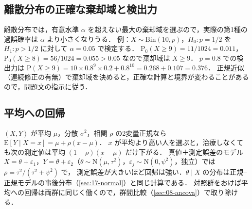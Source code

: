 \documentclass[a4paper,11pt,openany]{ltjsbook}
\newcommand{\E}{\mathrm{E}}
\newcommand{\Prob}{\mathrm{P}}
\newcommand{\Normal}{\mathrm{N}}
\newcommand{\Bin}{\mathrm{Bin}}
\begin{document}
\subsection{離散分布の正確な棄却域と検出力}\label{subsec:G-exact}
離散分布では，有意水準 $\alpha$ を超えない最大の棄却域を選ぶので，実際の第1種の過誤確率は $\alpha$ より小さくなりうる．
例：$X\sim\Bin(10,p)$，$H_0:p=1/2$ を $H_1:p>1/2$ に対して $\alpha=0.05$ で検定する．
$\Prob_0(X\ge9)=11/1024=0.011$，$\Prob_0(X\ge8)=56/1024=0.055>0.05$ なので棄却域は $X\ge9$．
$p=0.8$ での検出力は $\Prob(X\ge9)=10\times0.8^9\times0.2+0.8^{10}=0.268+0.107=0.376$．
正規近似（連続修正の有無）で棄却域を決めると，正確な計算と境界が変わることがあるので，問題文の指示に従う．

\subsection{平均への回帰}\label{subsec:G-rtm}
$(X,Y)$ が平均 $\mu$，分散 $\sigma^2$，相関 $\rho$ の2変量正規なら $\E[Y\mid X=x]=\mu+\rho(x-\mu)$．
$x$ が平均より高い人を選ぶと，治療しなくても次の測定値は平均 $(1-\rho)(x-\mu)$ だけ下がる．
真値＋測定誤差のモデル $X=\theta+\varepsilon_1$，$Y=\theta+\varepsilon_2$（$\theta\sim\Normal(\mu,\tau^2)$，$\varepsilon_j\sim\Normal(0,\psi^2)$，独立）では $\rho=\tau^2/(\tau^2+\psi^2)$ で，
測定誤差が大きいほど回帰は強い．$\theta\mid X$ の分布は正規--正規モデルの事後分布（\cref{sec:17-normal}）と同じ計算である．
対照群をおけば平均への回帰は両群に同じく働くので，群間比較（\cref{sec:08-ancova}）で取り除ける．
\end{document}
